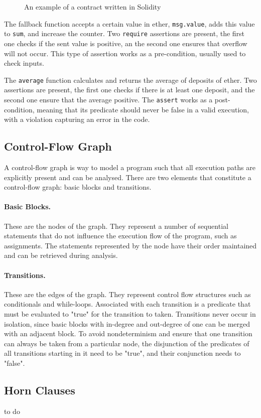 \begin{figure}

\caption{An example of a contract written in Solidity}
\label{fig:contractC}
\end{figure}

The fallback function accepts a certain value in ether, \texttt{msg.value}, adds this value to \texttt{sum}, and increase the counter. Two \texttt{require} assertions are present, the first one checks if the sent value is positive, an the second one ensures that overflow will not occur. This type of assertion works as a pre-condition, usually used to check inputs.

The \texttt{average} function calculates and returns the average of deposits of ether. Two assertions are present, the first one checks if there is at least one deposit, and the second one ensure that the average positive. The \texttt{assert} works as a post-condition, meaning that its predicate should never be false in a valid execution, with a violation capturing an error in the code.


\subsection{Control-Flow Graph}

A control-flow graph is way to model a program such that all execution paths are explicitly present and can be analysed. There are two elements that constitute a control-flow graph: basic blocks and transitions.

\paragraph{Basic Blocks.} These are the nodes of the graph. They represent a number of sequential statements that do not influence the execution flow of the program, such as assignments. The statements represented by the node have their order maintained and can be retrieved during analysis.

\paragraph{Transitions.} These are the edges of the graph. They represent control flow structures such as conditionals and while-loops. Associated with each transition is a predicate that must be evaluated to "true" for the transition to taken. Transitions never occur in isolation, since basic blocks with in-degree and out-degree of one can be merged with an adjacent block. To avoid nondeterminism and ensure that one transition can always be taken from a particular node, the disjunction of the predicates of all transitions starting in it need to be "true", and their conjunction needs to "false".


\subsection{Horn Clauses}

to do
